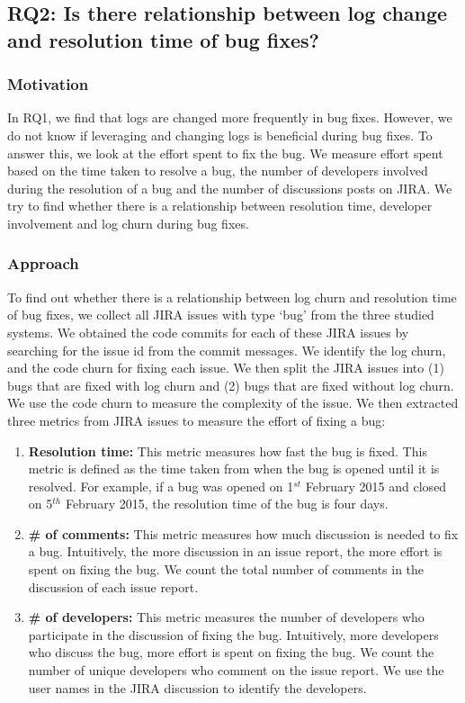 \subsection*{\textbf{RQ2: Is there relationship between log change and resolution time of bug fixes?}}


\subsubsection*{\textbf{Motivation}}

In RQ1, we find that logs are changed more frequently in bug fixes. However, we do not know if leveraging and changing logs is beneficial during bug fixes. To answer this, we look at the  effort spent to fix the bug. We measure effort spent based on the time taken to resolve a bug, the number of developers involved during the resolution of a bug and the number of discussions posts on JIRA. We try to find whether there is a relationship between resolution time, developer involvement and log churn during bug fixes. 


\subsubsection*{\textbf{Approach}}

To find out whether there is a relationship between log churn and resolution time of bug fixes, we collect all JIRA issues with type `bug' from the three studied systems. We obtained the code commits for each of these JIRA issues by searching for the issue id from the commit messages. We identify the log churn, and the code churn for fixing each issue. We then split the JIRA issues into (1) bugs that are fixed with log churn and (2) bugs that are fixed without log churn. We use the code churn to measure the complexity of the issue. We then extracted three metrics from JIRA issues to measure the effort of fixing a bug:

\begin{enumerate}
	\item \textbf{Resolution time:} This metric measures how fast the bug is fixed. This metric is defined as the time taken from when the bug is opened until it is resolved. For example, if a bug was opened on 1$ ^{st}$ February 2015 and closed on 5$ ^{th}$ February 2015, the resolution time of the bug is four days. 
	
	\item \textbf {\# of comments:} This metric measures how much discussion is needed to fix a bug. Intuitively, the more discussion in an issue report, the more effort is spent on fixing the bug. We count the total number of comments in the discussion of each issue report.
	
	\item \textbf {\# of developers:} This metric measures the number of developers who participate in the discussion of fixing the bug. Intuitively, more developers who discuss the bug, more effort is spent on fixing the bug. We count the number of unique developers who comment on the issue report. We use the user names in the JIRA discussion to identify the developers. 
\end{enumerate}

